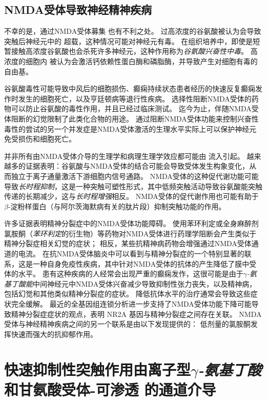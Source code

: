 \subsection{NMDA受体导致神经精神疾病}

不幸的是，通过NMDA受体募集  也有不利之处。
过高浓度的谷氨酸被认为会导致突触后神经元中的  超载，这种情况可能对神经元有毒。
在组织培养中，即使是短暂接触高浓度谷氨酸也会杀死许多神经元，这种作用称为\textit{谷氨酸兴奋性中毒}。
高浓度的细胞内  被认为会激活钙依赖性蛋白酶和磷脂酶，并导致产生对细胞有毒的自由基。


谷氨酸毒性可能导致中风后的细胞损伤、癫痫持续状态患者经历的快速反复癫痫发作时发生的细胞死亡，以及亨廷顿病等退行性疾病。
选择性阻断NMDA受体的药物可以防止谷氨酸的毒性作用，并且已经过临床测试。
迄今为止，伴随NMDA受体阻断的幻觉限制了此类化合物的用途。
通过阻断NMDA受体功能来控制兴奋性毒性的尝试的另一个并发症是NMDA受体激活的生理水平实际上可以保护神经元免受损伤和细胞死亡。


并非所有由NMDA受体介导的生理学和病理生理学效应都可能由  流入引起。
越来越多的证据表明：谷氨酸与NMDA受体的结合可能会导致受体发生构象变化，从而独立于离子通量激活下游细胞内信号通路。
NMDA受体的这种促代谢功能可能导致\textit{长时程抑制}，这是一种突触可塑性形式，其中低频突触活动导致谷氨酸能突触传递的长期减少，这与\textit{长时程增强}相反。
NMDA受体的促代谢作用也可能有助于 $\beta$-淀粉样蛋白（与阿尔茨海默病有关的肽片段）抑制突触功能的作用。


许多证据表明精神分裂症中的NMDA受体功能障碍。
使用苯环利定或全身麻醉剂氯胺酮（\textit{苯环利定}的衍生物）等药物对NMDA受体进行药理学阻断会产生类似于精神分裂症相关幻觉的症状；
相反，某些抗精神病药物会增强通过NMDA受体通道的电流。
在抗NMDA受体脑炎中可以看到与精神分裂症的一个特别显著的联系，这是一种自身免疫性疾病，其中针对NMDA受体的抗体的产生降低了膜中受体的水平。
患有这种疾病的人经常会出现严重的癫痫发作，这很可能是由于\textit{$\gamma$-氨基丁酸能}中间神经元中NMDA受体兴奋减少导致抑制性张力丧失，以及精神病，包括幻觉和其他类似精神分裂症的症状。
降低抗体水平的治疗通常会导致这些症状完全缓解。
最近的全基因组连锁分析进一步支持了NMDA受体功能下降可能导致精神分裂症症状的观点，表明 NR2A 基因与精神分裂症之间存在关联。
NMDA受体与神经精神疾病之间的另一个联系是由以下发现提供的：
低剂量的氯胺酮发挥快速而强大的抗抑郁作用。



\section{快速抑制性突触作用由离子型\textit{$\gamma$-氨基丁酸}和甘氨酸受体-可渗透  的通道介导}

